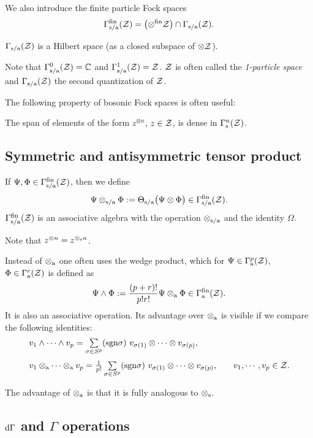 \documentclass{svmult}
\def\bet{\begin{theorem}}
\def\eet{\end{theorem}}
\def\cc{{\mathbb C}}
\def\s{{\rm s}}
\def\sa{{\rm s/a}}
\def\cZ{{\cal Z}}
\def\fin{{\rm fin}}
\def\a{{\rm a}}
\def\sgn{{\rm sgn}}
\def\d{{\rm d}}
\def\sgn{{\rm sgn}}
\def\d{{\rm d}}
\def\s{{\rm s}}
\begin{document}
We also introduce the finite particle Fock spaces
\[\Gamma_\sa^\fin(\cZ)=\bigl(\otimes^\fin\cZ\bigr)\cap
\Gamma_\sa(\cZ).\]


$\Gamma_\sa(\cZ)$ is a Hilbert space
(as a closed 
subspace of $\otimes\cZ$).



Note that $\Gamma_\sa^0(\cZ)=\cc$ and $\Gamma_\sa^1(\cZ)=\cZ$. $\cZ$ is often
called the {\em 1-particle space }and 
$\Gamma_\sa(\cZ)$ the second quantization of $\cZ$.

The following property of bosonic Fock spaces is often useful:
\bet 
The span of elements of 
the form $z^{\otimes n}$, $z\in\cZ$, is dense in $\Gamma_\s^n(\cZ)$.
\eet



\subsection{Symmetric and  antisymmetric tensor product}
If $\Psi,\Phi\in\Gamma_\sa^\fin(\cZ)$, then we define
 \[\Psi\otimes_\sa \Phi:=\Theta_\sa \bigl(\Psi\otimes \Phi\bigr)
\in \Gamma^\fin_\sa(\cZ).\]
$\Gamma_\sa^\fin(\cZ)$ 
 is an associative
 algebra with the operation $\otimes_\sa$ and the identity $\Omega$.


Note that
$z^{\otimes n}=z^{\otimes_\s n}$.


Instead of $\otimes_\a$ one often uses the wedge product, which for
$\Psi\in\Gamma_\a^p(\cZ)$, $\Phi\in\Gamma_\a^r(\cZ)$ is defined as
\[\Psi\wedge \Phi:=\frac{(p+r)!}{p!r!} \Psi\otimes_\a \Phi\in \Gamma_\a^\fin(\cZ).\]
It is also an associative operation.
Its advantage over $\otimes_\a$
is visible if we compare the following identities:
\[\begin{array}{lr}
v_1\wedge\cdots\wedge v_p=\sum\limits_{\sigma\in S^p}(\sgn\sigma)\ 
v_{\sigma( 1)}\otimes
\cdots\otimes v_{\sigma (p)},&\\[5mm]
v_1\otimes_\a\cdots\otimes_\a v_p=\frac{1}{p!}
\sum\limits_{\sigma\in S^p}(\sgn\sigma)\ v_{\sigma (1)}\otimes
\cdots\otimes v_{\sigma( p)},&\ \ \ v_1,\cdots,v_p\in\cZ.\end{array}\]


The advantage of $\otimes_\a$ is that it is fully analogous to $\otimes_\s$.









\subsection{$\d\Gamma$ and $\Gamma$ operations}
\end{document}
